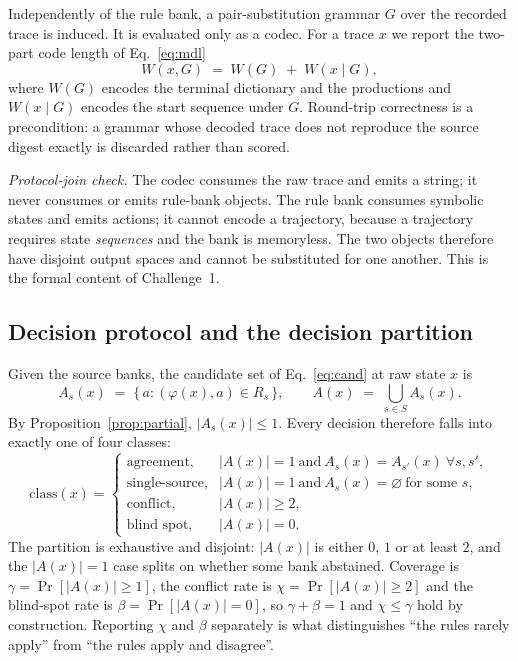 \documentclass[11pt,a4paper]{article}
\begin{document}
Independently of the rule bank, a pair-substitution grammar $G$ over the recorded trace is induced. It is evaluated only as a codec. For a trace $x$ we report the two-part code length of Eq.~\eqref{eq:mdl}
\begin{equation}
\label{eq:mdl}
W(x,G) \;=\; W(G) \;+\; W(x\mid G),
\end{equation}
where $W(G)$ encodes the terminal dictionary and the productions and $W(x\mid G)$ encodes the start sequence under $G$. Round-trip correctness is a precondition: a grammar whose decoded trace does not reproduce the source digest exactly is discarded rather than scored.

\emph{Protocol-join check.} The codec consumes the raw trace and emits a string; it never consumes or emits rule-bank objects. The rule bank consumes symbolic states and emits actions; it cannot encode a trajectory, because a trajectory requires state \emph{sequences} and the bank is memoryless. The two objects therefore have disjoint output spaces and cannot be substituted for one another. This is the formal content of Challenge~1.

\subsection{Decision protocol and the decision partition}
\label{sec:method-partition}

Given the source banks, the candidate set of Eq.~\eqref{eq:cand} at raw state $x$ is
\begin{equation}
\label{eq:cand}
A_{s}(x) \;=\; \{\, a : (\varphi(x),a)\in R_{s} \,\}, \qquad
A(x) \;=\; \bigcup_{s\in S} A_{s}(x).
\end{equation}
By Proposition~\ref{prop:partial}, $|A_{s}(x)|\le 1$. Every decision therefore falls into exactly one of four classes:
\begin{equation}
\label{eq:partition}
\mathrm{class}(x)=
\begin{cases}
\text{agreement}, & |A(x)|=1 \ \text{and}\ A_{s}(x)=A_{s'}(x)\ \forall s,s',\\[2pt]
\text{single-source}, & |A(x)|=1 \ \text{and}\ A_{s}(x)=\varnothing\ \text{for some } s,\\[2pt]
\text{conflict}, & |A(x)|\ge 2,\\[2pt]
\text{blind spot}, & |A(x)|=0.
\end{cases}
\end{equation}
The partition is exhaustive and disjoint: $|A(x)|$ is either $0$, $1$ or at least $2$, and the $|A(x)|=1$ case splits on whether some bank abstained. Coverage is $\gamma = \Pr[|A(x)|\ge 1]$, the conflict rate is $\chi=\Pr[|A(x)|\ge 2]$ and the blind-spot rate is $\beta=\Pr[|A(x)|=0]$, so $\gamma+\beta=1$ and $\chi\le\gamma$ hold by construction. Reporting $\chi$ and $\beta$ separately is what distinguishes ``the rules rarely apply'' from ``the rules apply and disagree''.
\end{document}
